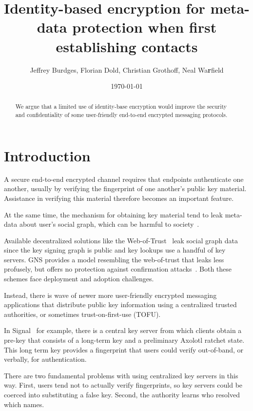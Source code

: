 \documentclass[twoside,letterpaper]{sig-alternate}
\title{Identity-based encryption for meta-data protection when first establishing contacts}
\author{Jeffrey Burdges, Florian Dold, Christian Grothoff, Neal Wa{\bf r}field}
\date{\today}
\begin{document}
\maketitle


\begin{abstract}
We argue that a limited use of identity-base encryption would improve
the security and confidentiality of some user-friendly end-to-end
encrypted messaging protocols.
\end{abstract}


\section{Introduction}


A secure end-to-end encrypted channel requires that endpoints
authenticate one another, usually by verifying the fingerprint of
one another's public key material.
Assistance in verifying this material therefore becomes an important
feature. %

At the same time, the mechanism for obtaining key material tend to
leak meta-data about user's social graph, which can be harmful to
society~\cite{skynet}.

Available decentralized solutions like the Web-of-Trust~\cite{wot}
leak social graph data since the key signing graph is public and
key lookups use a handful of key servers.  GNS provides a model
resembling the web-of-trust that leaks less profusely, but offers
no protection against confirmation attacks~\cite{gns}.
Both these schemes face deployment and adoption challenges.

Instead, there is wave of newer more user-friendly encrypted messaging
applications that distribute public key information using a centralized
trusted authorities, or sometimes trust-on-first-use (TOFU).

In Signal~\cite{TextSecure} for example, there is a central key server
from which clients obtain a pre-key that consists of a long-term key
and a preliminary Axolotl ratchet state.
This long term key provides a fingerprint that users could verify
out-of-band, or verbally, for authentication.

There are two fundamental problems with using centralized key servers
in this way.
First, users tend not to actually verify fingerprints, so
key servers could be coerced into substituting a false key.
Second, the authority learns who resolved which names.
\end{document}
